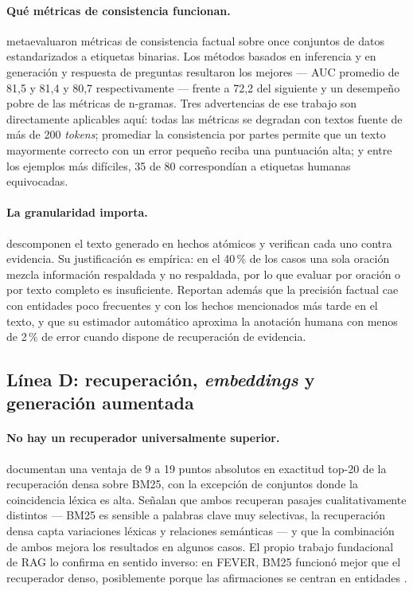 \paragraph{Qué métricas de consistencia funcionan.}
\textcite{honovich2022true} metaevaluaron métricas de consistencia factual sobre once
conjuntos de datos estandarizados a etiquetas binarias. Los métodos basados en
inferencia y en generación y respuesta de preguntas resultaron los mejores --- AUC
promedio de 81,5 y 81,4 y 80,7 respectivamente --- frente a 72,2 del siguiente y un
desempeño pobre de las métricas de n-gramas. Tres advertencias de ese trabajo son
directamente aplicables aquí: todas las métricas se degradan con textos fuente de más
de 200 \emph{tokens}; promediar la consistencia por partes permite que un texto
mayormente correcto con un error pequeño reciba una puntuación alta; y entre los
ejemplos más difíciles, 35 de 80 correspondían a etiquetas humanas equivocadas.

\paragraph{La granularidad importa.}
\textcite{min2023factscore} descomponen el texto generado en hechos atómicos y
verifican cada uno contra evidencia. Su justificación es empírica: en el 40\,\% de los
casos una sola oración mezcla información respaldada y no respaldada, por lo que
evaluar por oración o por texto completo es insuficiente. Reportan además que la
precisión factual cae con entidades poco frecuentes y con los hechos mencionados más
tarde en el texto, y que su estimador automático aproxima la anotación humana con
menos de 2\,\% de error cuando dispone de recuperación de evidencia.

\subsection{Línea D: recuperación, \emph{embeddings} y generación aumentada}
\label{sec:arte-d}

\paragraph{No hay un recuperador universalmente superior.}
\textcite{karpukhin2020dense} documentan una ventaja de 9 a 19 puntos absolutos en
exactitud top-20 de la recuperación densa sobre BM25, con la excepción de conjuntos
donde la coincidencia léxica es alta. Señalan que ambos recuperan pasajes
cualitativamente distintos --- BM25 es sensible a palabras clave muy selectivas, la
recuperación densa capta variaciones léxicas y relaciones semánticas --- y que la
combinación de ambos mejora los resultados en algunos casos. El propio trabajo
fundacional de RAG lo confirma en sentido inverso: en FEVER, BM25 funcionó mejor que
el recuperador denso, posiblemente porque las afirmaciones se centran en entidades
\parencite[p.~7]{lewis2020retrieval}.

